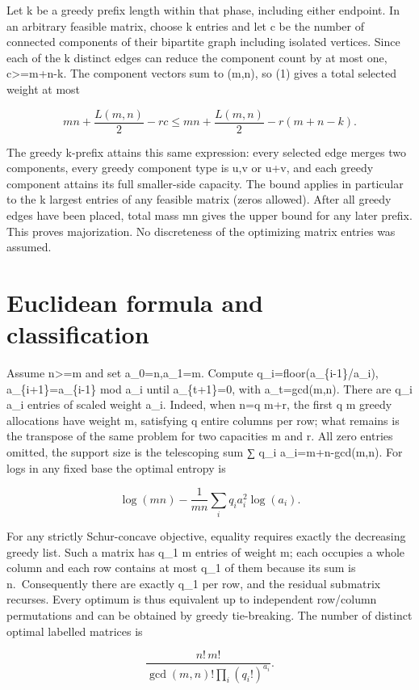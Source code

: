 \documentclass[11pt]{article}
\begin{document}
Let k be a greedy prefix length within that phase, including either endpoint. In an arbitrary feasible matrix, choose k entries and let c be the number of connected components of their bipartite graph including isolated vertices. Since each of the k distinct edges can reduce the component count by at most one, c\textgreater=m+n-k. The component vectors sum to (m,n), so (1) gives a total selected weight at most

\[mn+\frac{L(m,n)}2-rc\le mn+\frac{L(m,n)}2-r(m+n-k).\]

The greedy k-prefix attains this same expression: every selected edge merges two components, every greedy component type is u,v or u+v, and each greedy component attains its full smaller-side capacity. The bound applies in particular to the k largest entries of any feasible matrix (zeros allowed). After all greedy edges have been placed, total mass mn gives the upper bound for any later prefix. This proves majorization. No discreteness of the optimizing matrix entries was assumed.

\section{Euclidean formula and classification}\label{euclidean-formula-and-classification}

Assume n\textgreater=m and set a\_0=n,a\_1=m. Compute q\_i=floor(a\_\{i-1\}/a\_i), a\_\{i+1\}=a\_\{i-1\} mod a\_i until a\_\{t+1\}=0, with a\_t=gcd(m,n). There are q\_i a\_i entries of scaled weight a\_i. Indeed, when n=q m+r, the first q m greedy allocations have weight m, satisfying q entire columns per row; what remains is the transpose of the same problem for two capacities m and r. All zero entries omitted, the support size is the telescoping sum ∑ q\_i a\_i=m+n-gcd(m,n). For logs in any fixed base the optimal entropy is

\[\log(mn)-\frac{1}{mn}\sum_i q_i a_i^2\log(a_i).\]

For any strictly Schur-concave objective, equality requires exactly the decreasing greedy list. Such a matrix has q\_1 m entries of weight m; each occupies a whole column and each row contains at most q\_1 of them because its sum is n.~Consequently there are exactly q\_1 per row, and the residual submatrix recurses. Every optimum is thus equivalent up to independent row/column permutations and can be obtained by greedy tie-breaking. The number of distinct optimal labelled matrices is

\[\frac{n!\,m!}{\gcd(m,n)!\prod_i(q_i!)^{a_i}}.\]
\end{document}
